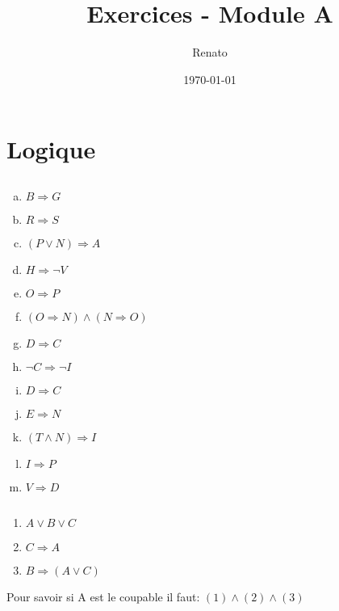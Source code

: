 \documentclass{report}
\title{\Large{\bsc{MATH-F-112 - Math\'{e}matiques}}\\
  Exercices - Module A
  }
\author{Renato \bsc{Costa Ribeiro}}
\date{\today}
\begin{document}
\maketitle
\tableofcontents

\chapter{Logique}
  \section{} %
    \begin{multicols}{4}
      \begin{enumerate}[a.]
	\item $B \Rightarrow G$
	\item $R \Rightarrow S$
	\item $(P \vee N) \Rightarrow A$
	\item $H \Rightarrow \neg V$
	\item $O \Rightarrow P$
	\item $(O \Rightarrow N) \wedge (N \Rightarrow O)$
	\item $D \Rightarrow C$
	\item $\neg C \Rightarrow \neg I$
	\item $D \Rightarrow C$
	\item $E \Rightarrow N$
	\item $(T \wedge N) \Rightarrow I$
	\item $I \Rightarrow P$
	\item $V \Rightarrow D$
      \end{enumerate}
    \end{multicols}

    
  \section{} %

  \begin{enumerate}[(1).]
  \item $A \vee B \vee C$
  \item $C \Rightarrow A$
  \item $B \Rightarrow (A \vee C)$
  \end{enumerate}
  Pour savoir si A est le coupable il faut: $(1)\wedge(2)\wedge(3)$
\end{document}
